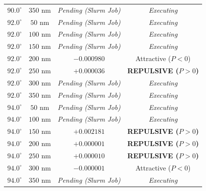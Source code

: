 \documentclass[12pt,letterpaper]{article}
\begin{document}
\begin{table}[h!]
\begin{tabular}{cccc}
$90.0^\circ$ & $350$ nm & \textit{Pending (Slurm Job)} & \textit{Executing} \\
$92.0^\circ$ & $50$ nm & \textit{Pending (Slurm Job)} & \textit{Executing} \\
$92.0^\circ$ & $100$ nm & \textit{Pending (Slurm Job)} & \textit{Executing} \\
$92.0^\circ$ & $150$ nm & \textit{Pending (Slurm Job)} & \textit{Executing} \\
$92.0^\circ$ & $200$ nm & $-0.000980$ & Attractive ($P<0$) \\
$92.0^\circ$ & $250$ nm & $+0.000036$ & \textbf{REPULSIVE ($P>0$)} \\
$92.0^\circ$ & $300$ nm & \textit{Pending (Slurm Job)} & \textit{Executing} \\
$92.0^\circ$ & $350$ nm & \textit{Pending (Slurm Job)} & \textit{Executing} \\
$94.0^\circ$ & $50$ nm & \textit{Pending (Slurm Job)} & \textit{Executing} \\
$94.0^\circ$ & $100$ nm & \textit{Pending (Slurm Job)} & \textit{Executing} \\
$94.0^\circ$ & $150$ nm & $+0.002181$ & \textbf{REPULSIVE ($P>0$)} \\
$94.0^\circ$ & $200$ nm & $+0.000001$ & \textbf{REPULSIVE ($P>0$)} \\
$94.0^\circ$ & $250$ nm & $+0.000010$ & \textbf{REPULSIVE ($P>0$)} \\
$94.0^\circ$ & $300$ nm & $-0.000001$ & Attractive ($P<0$) \\
$94.0^\circ$ & $350$ nm & \textit{Pending (Slurm Job)} & \textit{Executing} \\
\hline
\end{tabular}
\end{table}
\end{document}
